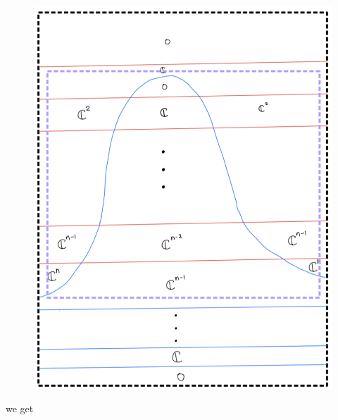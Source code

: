 \begin{enumerate}[label = (\roman*)]
\begin{enumerate}[label = (Step \arabic*)]
\begin{figure}[H]
    \centering
    \includegraphics[scale = 0.95]{diagrams/cobord_inter/6.png}
    \caption{}
    \label{fig:your-label}
\end{figure}

we get


\end{enumerate}
\end{enumerate}
